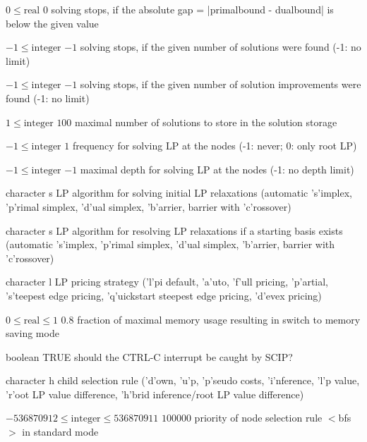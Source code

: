%
{$0\leq\textrm{real}$}%
{$0$}%
{solving stops, if the absolute gap = |primalbound - dualbound| is below the given value}%
{}

%
{$-1\leq\textrm{integer}$}%
{$-1$}%
{solving stops, if the given number of solutions were found (-1: no limit)}%
{}

%
{$-1\leq\textrm{integer}$}%
{$-1$}%
{solving stops, if the given number of solution improvements were found (-1: no limit)}%
{}

%
{$1\leq\textrm{integer}$}%
{$100$}%
{maximal number of solutions to store in the solution storage}%
{}

%
{$-1\leq\textrm{integer}$}%
{$1$}%
{frequency for solving LP at the nodes (-1: never; 0: only root LP)}%
{}

%
{$-1\leq\textrm{integer}$}%
{$-1$}%
{maximal depth for solving LP at the nodes (-1: no depth limit)}%
{}

%
{character}%
{s}%
{LP algorithm for solving initial LP relaxations (automatic 's'implex, 'p'rimal simplex, 'd'ual simplex, 'b'arrier, barrier with 'c'rossover)}%
{}

%
{character}%
{s}%
{LP algorithm for resolving LP relaxations if a starting basis exists (automatic 's'implex, 'p'rimal simplex, 'd'ual simplex, 'b'arrier, barrier with 'c'rossover)}%
{}

%
{character}%
{l}%
{LP pricing strategy ('l'pi default, 'a'uto, 'f'ull pricing, 'p'artial, 's'teepest edge pricing, 'q'uickstart steepest edge pricing, 'd'evex pricing)}%
{}

%
{$0\leq\textrm{real}\leq1$}%
{$0.8$}%
{fraction of maximal memory usage resulting in switch to memory saving mode}%
{}

%
{boolean}%
{TRUE}%
{should the CTRL-C interrupt be caught by SCIP?}%
{}

%
{character}%
{h}%
{child selection rule ('d'own, 'u'p, 'p'seudo costs, 'i'nference, 'l'p value, 'r'oot LP value difference, 'h'brid inference/root LP value difference)}%
{}

%
{$-536870912\leq\textrm{integer}\leq536870911$}%
{$100000$}%
{priority of node selection rule $<$bfs$>$ in standard mode}%
{}

